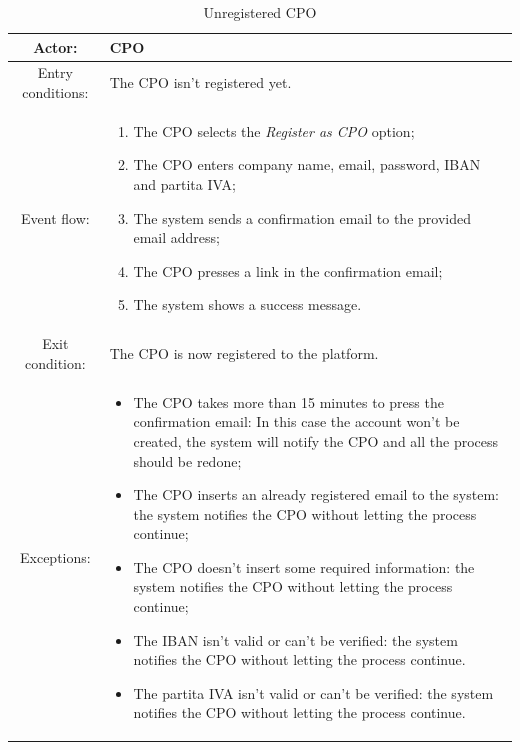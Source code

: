 \begin{table}[h]
    \begin{center}
        \begin{tabular}{|c||p{10cm}|}
            \hline
            Actor:            & \ac{CPO}                                        \\
            \hline
            Entry conditions: & The \ac{CPO} isn't registered yet.              \\
            \hline
            Event flow:       &
            \begin{enumerate}
                \item The \ac{CPO} selects the \textit{Register as \ac{CPO}} option;
                \item The \ac{CPO} enters company name, email, password, \ac{IBAN} and \gls{partita IVA};
                \item The system sends a confirmation email to the provided email address;
                \item The \ac{CPO} presses a link in the confirmation email;
                \item The system shows a success message.
            \end{enumerate}
            \\
            \hline
            Exit condition:   & The \ac{CPO} is now registered to the platform. \\
            \hline
            Exceptions:       &
            \begin{itemize}
                \item The \ac{CPO} takes more than 15 minutes to press the confirmation email: In this case the account won't be created, the system will notify the \ac{CPO} and all the process should be redone;
                \item The \ac{CPO} inserts an already registered email to the system: the system notifies the \ac{CPO} without letting the process continue;
                \item The \ac{CPO} doesn't insert some required information: the system notifies the \ac{CPO} without letting the process continue;
                \item The \ac{IBAN} isn't valid or can't be verified: the system notifies the \ac{CPO} without letting the process continue.
                \item The \gls{partita IVA} isn't valid or can't be verified: the system notifies the \ac{CPO} without letting the process continue.
            \end{itemize}
            \\
            \hline
        \end{tabular}
    \end{center}
    \caption{Unregistered \ac{CPO}}
\end{table}

